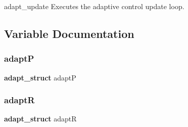 adapt\+\_\+update Executes the adaptive control update loop. 

\subsection{Variable Documentation}
\mbox{\label{adapt_8h_ad8376ec19c054f30f2d2df1a08765317}} 
\subsubsection{adaptP}
{\footnotesize\ttfamily \textbf{ adapt\+\_\+struct} adaptP}

\mbox{\label{adapt_8h_ab532a10d706811fb057b7c77d24b8657}} 
\subsubsection{adaptR}
{\footnotesize\ttfamily \textbf{ adapt\+\_\+struct} adaptR}

